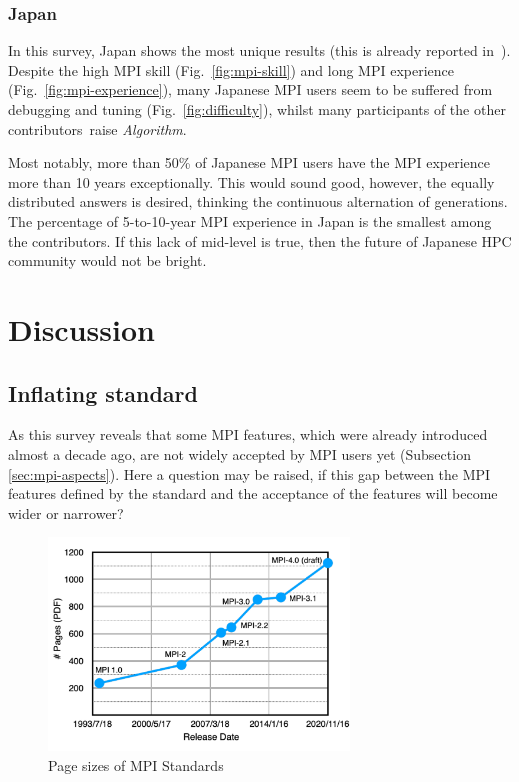 \documentclass[preprint,5p,times]{elsarticle}
\def\myquote#1{{\it #1}}
\def\countries{contributors}%
\begin{document}
\subsubsection*{Japan}

In this survey, Japan shows the most unique results (this is already
reported in~\cite{swopp2019}). Despite the high MPI
skill (Fig.~\ref{fig:mpi-skill}) and long MPI experience
(Fig.~\ref{fig:mpi-experience}), many Japanese MPI users seem to be
suffered from debugging and tuning (Fig.~\ref{fig:difficulty}), whilst
many participants of the other \countries\  raise \myquote{Algorithm}.

Most notably, more than 50\% of Japanese MPI users have the MPI
experience more than 10 years exceptionally. This would sound good,
however, the equally distributed answers is desired, thinking the
continuous alternation of generations. The percentage of 5-to-10-year
MPI experience in Japan is the smallest among the \countries. If this
lack of mid-level is true, then the future of Japanese HPC community
would not be bright.

\section{Discussion}

\subsection{Inflating standard}

As this survey reveals that some MPI features, which were already
introduced almost a decade ago, are not widely accepted by MPI users
yet (Subsection \ref{sec:mpi-aspects}). Here a question may be raised,
if this gap between the MPI features defined by the standard and the
acceptance of the features will become wider or narrower?

\begin{figure}[htb]
\begin{center}
\includegraphics[width=8cm]{Figs/MPI-Standards.pdf}
\caption{Page sizes of MPI Standards}
\label{fig:mpi-standards}
\end{center}
\end{figure}
\end{document}
